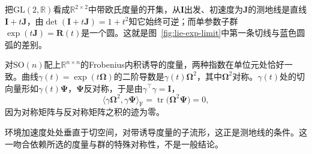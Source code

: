 把$\mathrm{GL}(2,\mathbb R)$看成$\mathbb R^{2\times2}$中带欧氏度量的开集，从$\bm I$出发、初速度为$\bm J$的测地线是直线$\bm I+t\bm J$，由$\det(\bm I+t\bm J)=1+t^2$知它始终可逆；而单参数子群$\exp(t\bm J)=\bm R(t)$是一个圆。这就是图~\ref{fig:lie-exp-limit}中第一条切线与蓝色圆弧的差别。

对$\mathrm{SO}(n)$配上$\mathbb R^{n\times n}$的Frobenius内积诱导的度量，两种指数在单位元处恰好一致。曲线$\gamma(t)=\exp(t\bm\Omega)$的二阶导数是$\gamma(t)\bm\Omega^2$，其中$\bm\Omega^2$对称。$\gamma(t)$处的切向量形如$\gamma(t)\bm\Psi$，$\bm\Psi$反对称，于是由$\gamma^\top\gamma=\bm I$，
\[
\langle\gamma\bm\Omega^2,\gamma\bm\Psi\rangle_{\mathrm F}
=\operatorname{tr}\bigl(\bm\Omega^2\bm\Psi\bigr)=0,
\]
因为对称矩阵与反对称矩阵之积的迹为零。

环境加速度处处垂直于切空间，对带诱导度量的子流形，这正是测地线的条件。这一吻合依赖所选的度量与群的特殊对称性，不是一般结论。
